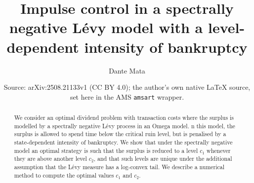 \documentclass[10pt,a4paper]{amsart}
\title{Impulse control in a spectrally negative L\'evy model with a level-dependent intensity of bankruptcy}
\author{Dante Mata}
\date{Source: arXiv:2508.21133v1 (CC BY 4.0); the author's own native \LaTeX{} source, set here in the AMS \texttt{amsart} wrapper.}
\begin{document}
\maketitle
\begin{abstract}
We consider an optimal dividend problem with transaction costs where the surplus is modelled by a spectrally negative L\'evy process in an Omega model. n this model, the surplus is allowed to spend time below the critical ruin level, but is penalised by a state-dependent intensity of bankruptcy. We show that under the spectrally negative model an optimal strategy is such that the surplus is reduced to a level $c_1$ whenever they are above another level $c_2$, and that such levels are unique under the additional assumption that the L\'evy measure has a log-convex tail. We describe a numerical method to compute the optimal values $c_1$ and $c_2$.
\end{abstract}
\end{document}
